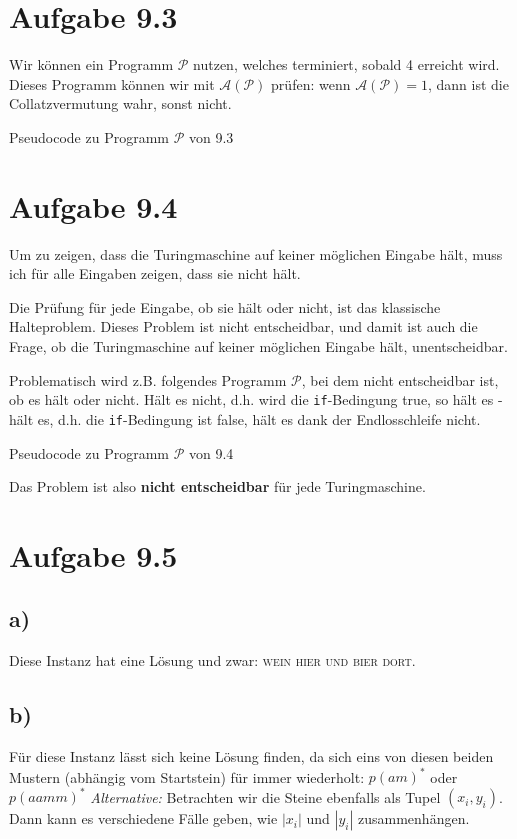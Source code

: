 \documentclass{article}
\begin{document}
\section*{Aufgabe 9.3}
Wir können ein Programm $\mathcal{P}$ nutzen, welches terminiert, sobald 4 erreicht wird. Dieses Programm können wir mit $\mathcal{A}(\mathcal{P})$ prüfen: wenn $\mathcal{A}(\mathcal{P}) = 1$, dann ist die Collatzvermutung wahr, sonst nicht.
\begin{algorithm}[ht]
  \caption{Pseudocode zu Programm $\mathcal{P}$ von 9.3}
\end{algorithm}


\section*{Aufgabe 9.4}
Um zu zeigen, dass die Turingmaschine auf keiner möglichen Eingabe hält, muss ich für alle Eingaben zeigen, dass sie nicht hält.

Die Prüfung für jede Eingabe, ob sie hält oder nicht, ist das klassische Halteproblem. Dieses Problem ist nicht entscheidbar, und damit ist auch die Frage, ob die Turingmaschine auf keiner möglichen Eingabe hält, unentscheidbar.

\bigskip

Problematisch wird z.B. folgendes Programm $\mathcal{P}$, bei dem nicht entscheidbar ist, ob es hält oder nicht. Hält es nicht, d.h. wird die \texttt{if}-Bedingung true, so hält es - hält es, d.h. die \texttt{if}-Bedingung ist false, hält es dank der Endlosschleife nicht.
\begin{algorithm}[ht]
  \caption{Pseudocode zu Programm $\mathcal{P}$ von 9.4}
\end{algorithm}
Das Problem ist also \textbf{nicht entscheidbar} für jede Turingmaschine.




\section*{Aufgabe 9.5}
\subsection*{a)}
Diese Instanz hat eine Lösung und zwar: \textsc{wein hier und bier dort}.
\subsection*{b)}
Für diese Instanz lässt sich keine Lösung finden, da sich eins von diesen beiden Mustern (abhängig vom Startstein) für immer wiederholt: $p(am)^*$ oder $p(aamm)^*$
\bigskip
\emph{Alternative:} Betrachten wir die Steine ebenfalls als Tupel $(x_i,y_i)$. Dann kann es verschiedene Fälle geben, wie $|x_i|$ und $|y_i|$ zusammenhängen.
\end{document}
